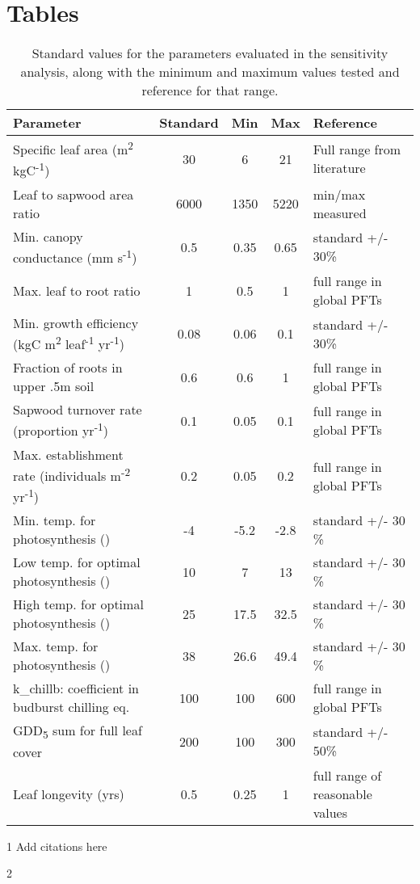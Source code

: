 \documentclass[]{article}
\title{}
\author{}
\begin{document}
	
\section{Tables}

\begin{table}[ht]
	\begin{threeparttable}
	\caption{Standard values for the parameters evaluated in the sensitivity analysis, along with the minimum and maximum values tested and reference for that range.} 
	\begin{tabular}{lcccl}
		\toprule
		Parameter & Standard & Min & Max & Reference \\ 
		\midrule
		Specific leaf area (m\textsuperscript{2} kgC\textsuperscript{-1}) & 30 & 6 & 21 & Full range from literature\tnote1 \\
		Leaf to sapwood area ratio & 6000 & 1350 & 5220 & min/max measured\tnote2 \\
		Min. canopy conductance (mm s\textsuperscript{-1}) & 0.5 & 0.35 & 0.65 & standard +/- 30\% \\
		Max. leaf to root ratio & 1 & 0.5 & 1 & full range in global PFTs \\
		Min. growth efficiency (kgC m\textsuperscript{2} leaf\textsuperscript{-1} yr\textsuperscript{-1}) & 0.08 & 0.06 & 0.1 & standard +/- 30\% \\
		Fraction of roots in upper .5m soil & 0.6 & 0.6 & 1 & full range in global PFTs \\
		Sapwood turnover rate (proportion yr\textsuperscript{-1}) & 0.1 & 0.05 & 0.1 & full range in global PFTs \\
		Max. establishment rate (individuals m\textsuperscript{-2} yr\textsuperscript{-1}) & 0.2 & 0.05 & 0.2 & full range in global PFTs \\
		Min. temp. for photosynthesis (\celsius) & -4 & -5.2 & -2.8 & standard +/- 30 \% \\
		Low temp. for optimal photosynthesis (\celsius) & 10 & 7 & 13 & standard +/- 30 \% \\
		High temp. for optimal photosynthesis (\celsius) & 25 & 17.5 & 32.5 & standard +/- 30 \% \\
		Max. temp. for photosynthesis (\celsius) & 38 & 26.6 & 49.4 & standard +/- 30 \% \\
		k\_chillb: coefficient in budburst chilling eq. & 100 & 100 & 600 & full range in global PFTs \\
		GDD\textsubscript{5} sum for full leaf cover & 200 & 100 & 300 & standard +/- 50\% \\
		Leaf longevity (yrs) & 0.5 & 0.25 & 1 & full range of reasonable values \\
	\bottomrule
	\end{tabular}
\begin{tablenotes}
	\item[1] Add citations here
	\item[2] \citet{Ganskopp1986}
\end{tablenotes}
\end{threeparttable}
\end{table}
\end{document}
